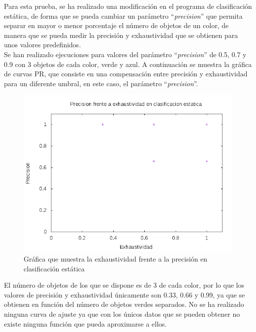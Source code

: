 \noindent Para esta prueba, se ha realizado una modificación en el programa de clasificación estática, de forma que se pueda cambiar un parámetro ``\textit{precision}'' que permita separar en mayor o menor porcentaje el número de objetos de un color, de manera que se pueda medir la precisión y exhaustividad que se obtienen para unos valores predefinidos. \\

\noindent Se han realizado ejecuciones para valores del parámetro ``\textit{precision}'' de 0.5, 0.7 y 0.9 con 3 objetos de cada color, verde y azul. A continuación se muestra la gráfica de curvas PR, que consiste en una compensación entre precisión y exhaustividad para un diferente umbral, en este caso, el parámetro ``\textit{precision}''.\\

\begin{figure}[H]
	\centering
	\label{cd:pr}
	\includegraphics[scale=0.55]{imagenes/PR2.png}
	\caption{Gráfica que muestra la exhaustividad frente a la precisión en clasificación estática}
\end{figure}

\noindent El número de objetos de los que se dispone es de 3 de cada color, por lo que los valores de precisión y exhaustividad únicamente son 0.33, 0.66 y 0.99, ya que se obtienen en función del número de objetos verdes separados. No se ha realizado ninguna curva de ajuste ya que con los únicos datos que se pueden obtener no existe ninguna función que pueda aproximarse a ellos. \\

